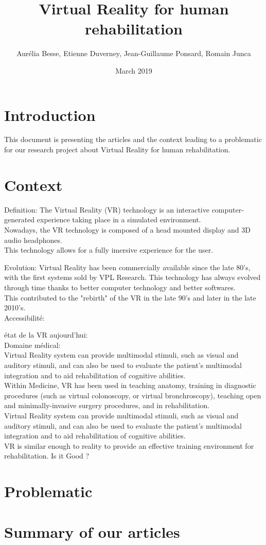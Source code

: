 \documentclass{article}
\title{Virtual Reality for human rehabilitation}
\author{ Aurélia Besse, Etienne Duverney, Jean-Guillaume Ponsard, Romain Junca }
\date{March 2019}
\begin{document}
\maketitle

\section{Introduction}

This document is presenting the articles and the context leading to a problematic for our research project about Virtual Reality for human rehabilitation.


\section{Context}

Definition:
The Virtual Reality (VR) technology is an interactive computer-generated experience taking place in a simulated environment. 
\\
Nowadays, the VR technology is composed of a head mounted display and 3D audio headphones.
\\
This technology allows for a fully imersive experience for the user.

Evolution:
Virtual Reality has been commercially available since the late 80's, with the first systems sold by VPL Research.
This technology has always evolved through time thanks to better computer technology and better softwares.
\\
This contributed to the "rebirth" of the VR in the late 90's and later in the late 2010's.
\\



Accessibilité:


état de la VR aujourd'hui: \\



Domaine médical: \\
Virtual Reality system can provide multimodal stimuli, such as visual and auditory stimuli, and can also be used to evaluate the patient’s multimodal integration and to aid rehabilitation of cognitive abilities. \\
Within Medicine, VR has been used in teaching anatomy, training in diagnostic procedures (such as virtual colonoscopy, or virtual bronchroscopy), teaching open and minimally-invasive surgery procedures, and in rehabilitation. \\
Virtual Reality system can provide multimodal stimuli, such as visual and auditory stimuli, and can also be used to evaluate the patient’s multimodal integration and to aid rehabilitation of cognitive abilities. \\

VR is similar enough to reality to provide an effective training environment for rehabilitation. 
Is it Good ?


\section{Problematic}


\section{Summary of our articles}
\end{document}
